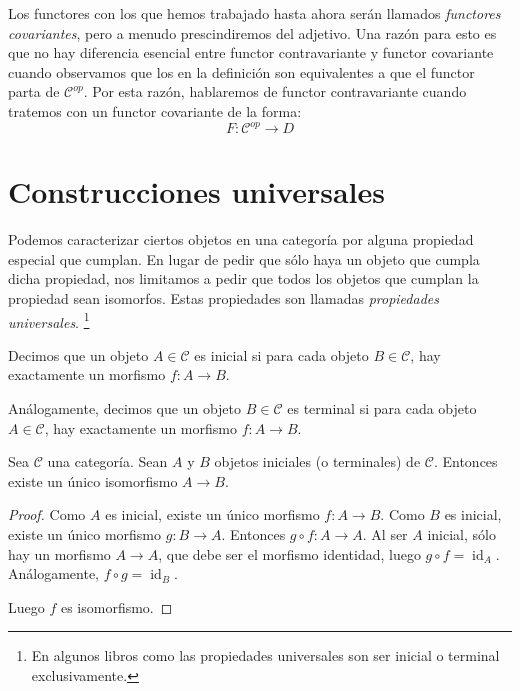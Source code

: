 \documentclass[12pt, twoside]{book}
\newcommand{\cat}{{\mathcal{C}}}
\DeclareMathOperator{\id}{id}
\begin{document}
Los functores con los que hemos trabajado hasta ahora serán llamados \emph{functores covariantes}, pero a menudo prescindiremos del adjetivo.
Una razón para esto es que no hay diferencia esencial entre functor contravariante y functor covariante cuando observamos que los  en la definición son equivalentes a que el functor parta de $\cat^{op}$.
Por esta razón, hablaremos de functor contravariante cuando tratemos con un functor covariante de la forma:
\[ F \colon \cat^{op} \to D \]

\section{Construcciones universales}
Podemos caracterizar ciertos objetos en una categoría por alguna propiedad especial que cumplan. En lugar de pedir que sólo haya un objeto que cumpla dicha propiedad, nos limitamos a pedir que todos los objetos que cumplan la propiedad sean isomorfos. Estas propiedades son llamadas \emph{propiedades universales}.
\footnote{En algunos libros como \cite{Spivak} las propiedades universales son ser inicial o terminal exclusivamente.}

\begin{definition}
Decimos que un objeto $A \in \cat$ es inicial si para cada objeto $B \in \cat$, hay exactamente un morfismo $f \colon A \to B$.

Análogamente, decimos que un objeto $B \in \cat$ es terminal si para cada objeto $A \in \cat$, hay exactamente un morfismo $f \colon A \to B$.
\end{definition}

\begin{proposition}
Sea $\cat$ una categoría. Sean $A$ y $B$ objetos iniciales (o terminales) de $\cat$.
Entonces existe un único isomorfismo $A \to B$.
\end{proposition}
\begin{proof}
Como $A$ es inicial, existe un único morfismo $f \colon A \to B$.
Como $B$ es inicial, existe un único morfismo $g \colon B \to A$.
Entonces $g \circ f \colon A \to A$.
Al ser $A$ inicial, sólo hay un morfismo $A \to A$, que debe ser el morfismo identidad, luego $g \circ f = \id_A$.
Análogamente, $f \circ g = \id_B$.

Luego $f$ es isomorfismo.
\end{proof}
\end{document}
